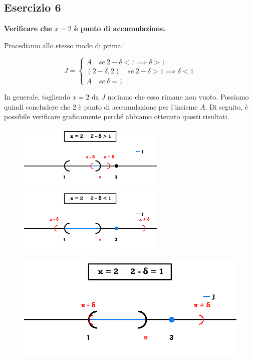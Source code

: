 \documentclass{article}
\begin{document}
\subsection{Esercizio 6}
\textbf{Verificare che $x = 2$ è punto di accumulazione.}

\noindent Procediamo allo stesso modo di prima:

\begin{equation*}
    J = \begin{cases}
        A \quad se \ 2 - \delta < 1 \implies \delta > 1 \\
        (2-\delta, 2) \quad se \ 2 - \delta > 1 \implies \delta < 1 \\
        A \quad se \ \delta = 1
    \end{cases}
\end{equation*}

\noindent In generale, togliendo $x = 2$ da $J$ notiamo che esso rimane non vuoto. Possiamo quindi concludere che $2$ è punto di accumulazione per l'insieme $A$. Di seguito, è possibile verificare graficamente perché abbiamo ottenuto questi risultati. 

\begin{figure}[!h]
    \centering
    \includegraphics[width=7cm]{./images/AccPoints6.pdf}\hfill
    \includegraphics[width=7cm]{./images/AccPoints7.pdf}
\end{figure}

\begin{figure}[!h]
    \centering
    \includegraphics[width=12cm]{./images/AccPoints8.pdf}
\end{figure}
\end{document}
